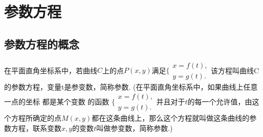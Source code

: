 \documentclass{BHCexam}
\begin{document}
\newpage
\section{参数方程}
\subsection{参数方程的概念}
在平面直角坐标系中，若曲线$C$上的点$ P(x,y) $满足$\Bigg\{\begin{aligned}
x=f(t),\\y=g(t).
\end{aligned}$该方程叫曲线C的参数方程，变量t是参变数，简称参数.{\kaishu
(在平面直角坐标系中，如果曲线上任意一点的坐标 都是某个变数 的函数 $\Bigg\{\begin{aligned}
x=f(t),\\y=g(t).
\end{aligned}$并且对于$ t $的每一个允许值，由这个方程所确定的点$ M(x,y) $都在这条曲线上，那么这个方程就叫做这条曲线的参数方程，联系变数$ x,y $的变数$ t $叫做参变数，简称参数.)}
\end{document}
